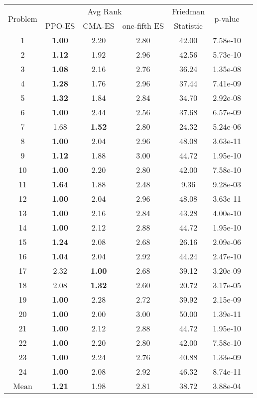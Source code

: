 
        \begin{tabular}{ccccccc}
        \toprule
        \multirow{2}{*}{Problem} & \multicolumn{3}{c}{Avg Rank} & Friedman & \multirow{2}{*}{p-value} \\
        \cline{2-4}
        & PPO-ES & CMA-ES & one-fifth ES & Statistic & \\
        \midrule
        1 & \textbf{1.00} & 2.20 & 2.80 & 42.00 & 7.58e-10 \\
2 & \textbf{1.12} & 1.92 & 2.96 & 42.56 & 5.73e-10 \\
3 & \textbf{1.08} & 2.16 & 2.76 & 36.24 & 1.35e-08 \\
4 & \textbf{1.28} & 1.76 & 2.96 & 37.44 & 7.41e-09 \\
5 & \textbf{1.32} & 1.84 & 2.84 & 34.70 & 2.92e-08 \\
6 & \textbf{1.00} & 2.44 & 2.56 & 37.68 & 6.57e-09 \\
7 & 1.68 & \textbf{1.52} & 2.80 & 24.32 & 5.24e-06 \\
8 & \textbf{1.00} & 2.04 & 2.96 & 48.08 & 3.63e-11 \\
9 & \textbf{1.12} & 1.88 & 3.00 & 44.72 & 1.95e-10 \\
10 & \textbf{1.00} & 2.20 & 2.80 & 42.00 & 7.58e-10 \\
11 & \textbf{1.64} & 1.88 & 2.48 & 9.36 & 9.28e-03 \\
12 & \textbf{1.00} & 2.04 & 2.96 & 48.08 & 3.63e-11 \\
13 & \textbf{1.00} & 2.16 & 2.84 & 43.28 & 4.00e-10 \\
14 & \textbf{1.00} & 2.12 & 2.88 & 44.72 & 1.95e-10 \\
15 & \textbf{1.24} & 2.08 & 2.68 & 26.16 & 2.09e-06 \\
16 & \textbf{1.04} & 2.04 & 2.92 & 44.24 & 2.47e-10 \\
17 & 2.32 & \textbf{1.00} & 2.68 & 39.12 & 3.20e-09 \\
18 & 2.08 & \textbf{1.32} & 2.60 & 20.72 & 3.17e-05 \\
19 & \textbf{1.00} & 2.28 & 2.72 & 39.92 & 2.15e-09 \\
20 & \textbf{1.00} & 2.00 & 3.00 & 50.00 & 1.39e-11 \\
21 & \textbf{1.00} & 2.12 & 2.88 & 44.72 & 1.95e-10 \\
22 & \textbf{1.00} & 2.20 & 2.80 & 42.00 & 7.58e-10 \\
23 & \textbf{1.00} & 2.24 & 2.76 & 40.88 & 1.33e-09 \\
24 & \textbf{1.00} & 2.08 & 2.92 & 46.32 & 8.74e-11 \\
\midrule
Mean & \textbf{1.21} & 1.98 & 2.81 & 38.72 & 3.88e-04 \\
\bottomrule
\end{tabular}